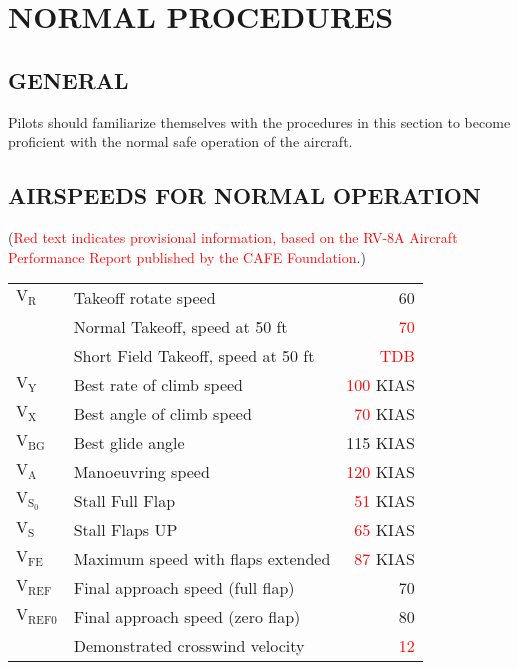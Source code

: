 \chapter{NORMAL PROCEDURES}
\vspace{\minitocspacebefore}
\minitoc
\cleardoublepage

\section{GENERAL}

Pilots should familiarize themselves with the procedures in this section
to become proficient with the normal safe operation of the aircraft.

\section{AIRSPEEDS FOR NORMAL OPERATION}
(\textcolor{red}{Red text indicates provisional information, based
on the RV-8A Aircraft Performance Report published by the CAFE Foundation}.)

\begin{center}\begin{tabular}{llr}
$\mathrm{V_{R}}$&
Takeoff rotate speed&
60\tabularnewline
&
Normal Takeoff, speed at 50 ft &
\textcolor{red}{70}\tabularnewline
&
Short Field Takeoff, speed at 50 ft&
\textcolor{red}{TDB}\tabularnewline
$\mathrm{V_{Y}}$ &
Best rate of climb speed&
\textcolor{red}{100} KIAS\tabularnewline
$\mathrm{V_{X}}$ &
Best angle of climb speed&
\textcolor{red}{70} KIAS\tabularnewline
$\mathrm{V_{BG}}$&
Best glide angle&
115 KIAS\tabularnewline
$\mathrm{V_{A}}$ &
Manoeuvring speed&
\textcolor{red}{120} KIAS\tabularnewline
$\mathrm{V_{S_{0}}}$ &
Stall Full Flap&
\textcolor{red}{51} KIAS\tabularnewline
$\mathrm{V_{S}}$ &
Stall Flaps UP&
\textcolor{red}{65} KIAS\tabularnewline
$\mathrm{V_{FE}}$ &
Maximum speed with flaps extended &
\textcolor{red}{87} KIAS\tabularnewline
$\mathrm{V_{REF}}$ &
Final approach speed (full flap)&
70\tabularnewline
$\mathrm{V_{REF0}}$ &
Final approach speed (zero flap)&
80\tabularnewline
&
Demonstrated crosswind velocity&
\textcolor{red}{12}\tabularnewline
\end{tabular}\end{center}

%

